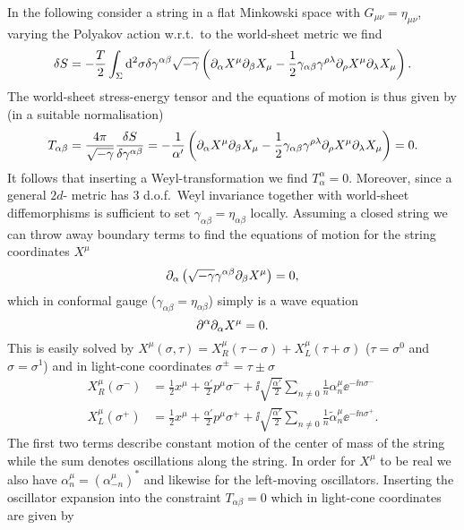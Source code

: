 In the following consider a string in a flat Minkowski space with $G_{\mu\nu}=\eta_{\mu\nu}$, varying the Polyakov action w.r.t.\ to the world-sheet metric we find 
\begin{equation}
    \delta S = -\frac{T}{2}\int_\Sigma \mathrm{d}^2\sigma \delta\gamma^{\alpha\beta}\sqrt{-\gamma}\left(\partial_\alpha X^\mu\partial_\beta X_\mu-\frac{1}{2}\gamma_{\alpha\beta}\gamma^{\rho\lambda}\partial_\rho X^\mu\partial_\lambda X_\mu\right).
\end{equation}
The world-sheet stress-energy tensor and the equations of motion is thus given by (in a suitable normalisation)
\begin{equation}
    T_{\alpha\beta}= \frac{4\pi}{\sqrt{-\gamma}}\frac{\delta S}{\delta\gamma^{\alpha\beta}} = -\frac{1}{\alpha'}\left(\partial_\alpha X^\mu\partial_\beta X_\mu-\frac{1}{2}\gamma_{\alpha\beta}\gamma^{\rho\lambda}\partial_\rho X^\mu\partial_\lambda X_\mu\right) = 0.
\end{equation}
It follows that inserting a Weyl-transformation we find $T^{\alpha}_\alpha=0$. Moreover, since a general $2d$- metric has $3$ d.o.f.\ Weyl invariance together with world-sheet diffemorphisms is sufficient to set $\gamma_{\alpha\beta}=\eta_{\alpha\beta}$ locally. Assuming a closed string we can throw away boundary terms to find the equations of motion for the string coordinates $X^\mu$
\begin{equation}
    \partial_\alpha\left(\sqrt{-\gamma}\gamma^{\alpha\beta}\partial_\beta X^\mu\right) = 0,
\end{equation}
which in conformal gauge ($\gamma_{\alpha\beta}=\eta_{\alpha\beta}$) simply is a wave equation 
\begin{equation}
    \partial^\alpha\partial_\alpha X^\mu = 0.
\end{equation}
This is easily solved by $X^\mu(\sigma,\tau)=X^\mu_R(\tau-\sigma)+X^\mu_L(\tau+\sigma)$ ($\tau =\sigma^0$ and $\sigma=\sigma^1$) and in light-cone coordinates $\sigma^{\pm}=\tau\pm\sigma$ 
\begin{equation}
    \begin{aligned}
        X^\mu_R(\sigma^-) &= \frac{1}{2}x^\mu+\frac{\alpha'}{2}p^\mu\sigma^-+\ii\sqrt{\frac{\alpha'}{2}}\sum_{n\neq 0}\frac{1}{n}\alpha_n^\mu\ee^{-\ii n\sigma^-}\\
        X^\mu_L(\sigma^+) &= \frac{1}{2}x^\mu+\frac{\alpha'}{2}p^\mu\sigma^++\ii\sqrt{\frac{\alpha'}{2}}\sum_{n\neq 0}\frac{1}{n}\tilde{\alpha}_n^\mu\ee^{-\ii n\sigma^+}. 
    \end{aligned}
\end{equation}
The first two terms describe constant motion of the center of mass of the string while the sum denotes oscillations along the string. In order for $X^\mu$ to be real we also have $\alpha_{n}^\mu=(\alpha_{-n}^\mu)^*$ and likewise for the left-moving oscillators. Inserting the oscillator expansion into the constraint $T_{\alpha\beta}=0$ which in light-cone coordinates are given by 
